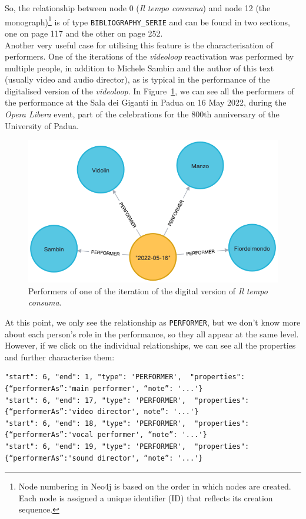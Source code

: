 So, the relationship between node 0 (\textit{Il tempo consuma}) and node 12 (the monograph)\footnote{Node numbering in Neo4j is based on the order in which nodes are created. Each node is assigned a unique identifier (ID) that reflects its creation sequence.} is of type \texttt{BIBLIOGRAPHY\_SERIE} and can be found in two sections, one on page 117 and the other on page 252.\\
Another very useful case for utilising this feature is the characterisation of performers. One of the iterations of the \textit{videoloop} reactivation was performed by multiple people, in addition to Michele Sambin and the author of this text (usually video and audio director), as is typical in the performance of the digitalised version of the \textit{videoloop}. In Figure~\ref{fig:c4-neo4j-performer}, we can see all the performers of the performance at the Sala dei Giganti in Padua on 16 May 2022, during the \textit{Opera Libera} event, part of the celebrations for the 800th anniversary of the University of Padua.
\begin{figure}[!h]
    \centering
    \includegraphics[width=0.75\linewidth]{chapters/4-MDC_model_application/image/neo4j-performer.png}
    \caption{Performers of one of the iteration of the digital version of \textit{Il tempo consuma}.}
    \label{fig:c4-neo4j-performer}
\end{figure}
At this point, we only see the relationship as \texttt{PERFORMER}, but we don’t know more about each person's role in the performance, so they all appear at the same level. However, if we click on the individual relationships, we can see all the properties and further characterise them:
\begin{lstlisting}[style=json]
"start": 6, "end": 1, "type": 'PERFORMER',  "properties": {“performerAs”:'main performer', “note”: '...'}
"start": 6, "end": 17, "type": 'PERFORMER',  "properties": {“performerAs”:'video director', note”: '...'}
"start": 6, "end": 18, "type": 'PERFORMER',  "properties": {“performerAs”:'vocal performer', “note”: '...'}
"start": 6, "end": 19, "type": 'PERFORMER',  "properties": {“performerAs”:'sound director', “note”: '...'}
\end{lstlisting}
